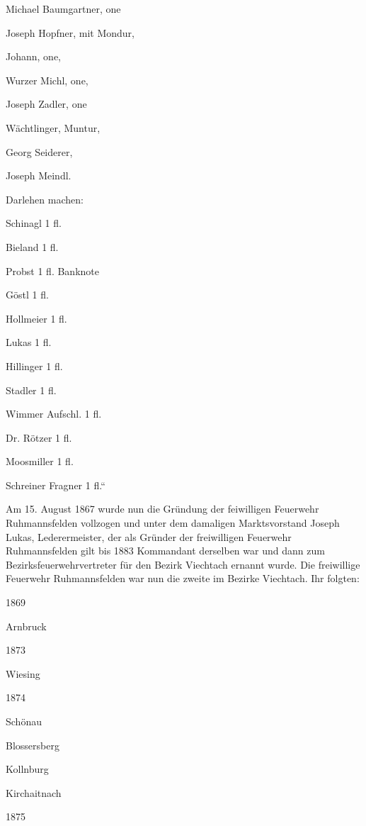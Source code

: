 \documentclass[12pt,a4pager]{book}
\begin{document}
Michael Baumgartner, one

Joseph Hopfner, mit Mondur,

Johann, one,

Wurzer Michl, one,

Joseph Zadler, one

Wächtlinger, Muntur,

Georg Seiderer,

Joseph Meindl.







Darlehen machen:



Schinagl 1 fl.

Bieland 1 fl.

Probst 1 fl. Banknote

Göstl 1 fl.

Hollmeier 1 fl.

Lukas 1 fl.



Hillinger 1 fl.

Stadler 1 fl.

Wimmer Aufschl. 1 fl.

Dr. Rötzer 1 fl.

Moosmiller 1 fl.

Schreiner Fragner 1 fl.“



Am 15. August 1867 wurde nun die Gründung der feiwilligen Feuerwehr
Ruhmannsfelden vollzogen und unter dem damaligen Marktsvorstand Joseph Lukas,
Lederermeister, der als Gründer der freiwilligen Feuerwehr Ruhmannsfelden gilt
bis 1883 Kommandant derselben war und dann zum Bezirksfeuerwehrvertreter für den
Bezirk Viechtach ernannt wurde. Die freiwillige Feuerwehr Ruhmannsfelden war nun
die zweite im Bezirke Viechtach. Ihr folgten:



1869

Arnbruck

1873

Wiesing

1874

Schönau



Blossersberg



Kollnburg



Kirchaitnach

1875
\end{document}
